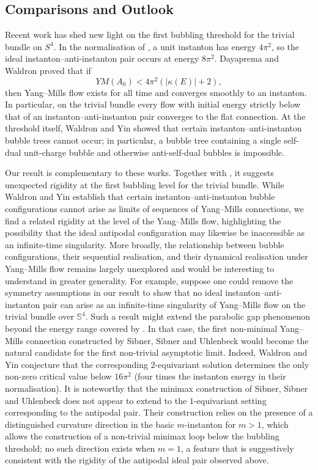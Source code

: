 \documentclass[11pt,a4paper]{article}
\numberwithin{equation}{section}
\theoremstyle{plain}
\theoremstyle{remark}
\begin{document}
\subsection{Comparisons and Outlook}
Recent work has shed new light on the first bubbling threshold for the trivial bundle on $S^4$. In the normalisation of \cite{dayaprema2026parabolicgaptheoremsyangmills}, a unit instanton has energy $4\pi^2$, so the ideal instanton--anti-instanton pair occurs at energy $8\pi^2$. Dayaprema and Waldron \cite{dayaprema2026parabolicgaptheoremsyangmills} proved that if
$$
YM(A_0)<4\pi^2(|\kappa(E)|+2),
$$
then Yang--Mills flow exists for all time and converges smoothly to an instanton. In particular, on the trivial bundle every flow with initial energy strictly below that of an instanton--anti-instanton pair converges to the flat connection. At the threshold itself, Waldron and Yin \cite{waldron2026yangmillsequationnearinstantonantiinstanton} showed that certain instanton--anti-instanton bubble trees cannot occur; in particular, a bubble tree containing a single self-dual unit-charge bubble and otherwise anti-self-dual bubbles is impossible.

Our result is complementary to these works. Together with \cite{waldron2026yangmillsequationnearinstantonantiinstanton}, it suggests unexpected rigidity at the first bubbling level for the trivial bundle. While Waldron and Yin establish that certain instanton--anti-instanton bubble configurations cannot arise as limits of sequences of Yang–Mills connections, we find a related rigidity at the level of the Yang–Mills flow, highlighting the possibility that the ideal antipodal configuration may likewise be inaccessible as an infinite-time singularity. More broadly, the relationship between bubble configurations, their sequential realisation, and their dynamical realisation under Yang–Mills flow remains largely unexplored and would be interesting to understand in greater generality. For example, suppose one could remove the symmetry assumptions in our result to show that no ideal instanton--anti-instanton pair can arise as an infinite-time singularity of Yang--Mills flow on the trivial bundle over $\mathbb S^4$. Such a result might extend the parabolic gap phenomenon beyond the energy range covered by \cite{dayaprema2026parabolicgaptheoremsyangmills}. In that case, the first non-minimal Yang--Mills connection constructed by Sibner, Sibner and Uhlenbeck \cite{SibnerSibnerUhlenbeck1989} would become the natural candidate for the first non-trivial asymptotic limit. Indeed, Waldron and Yin conjecture that the corresponding $2$-equivariant solution determines the only non-zero critical value below $16\pi^2$ (four times the instanton energy in their normalisation). It is noteworthy that the minimax construction of Sibner, Sibner and Uhlenbeck does not appear to extend to the $1$-equivariant setting corresponding to the antipodal pair. Their construction relies on the presence of a distinguished curvature direction in the basic $m$-instanton for $m>1$, which allows the construction of a non-trivial minimax loop below the bubbling threshold; no such direction exists when $m=1$, a feature that is suggestively consistent with the rigidity of the antipodal ideal pair observed above.
\end{document}
